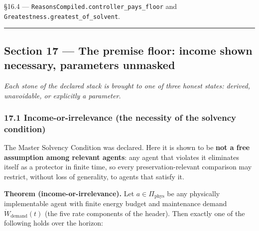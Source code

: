 \documentclass[
]{article}
\begin{document}
§16.4 ---
\texttt{R\allowbreak{}e\allowbreak{}a\allowbreak{}s\allowbreak{}o\allowbreak{}n\allowbreak{}s\allowbreak{}C\allowbreak{}o\allowbreak{}m\allowbreak{}p\allowbreak{}i\allowbreak{}l\allowbreak{}e\allowbreak{}d\allowbreak{}.\allowbreak{}c\allowbreak{}o\allowbreak{}n\allowbreak{}t\allowbreak{}r\allowbreak{}o\allowbreak{}l\allowbreak{}l\allowbreak{}e\allowbreak{}r\allowbreak{}\_\allowbreak{}p\allowbreak{}a\allowbreak{}y\allowbreak{}s\allowbreak{}\_\allowbreak{}f\allowbreak{}l\allowbreak{}o\allowbreak{}o\allowbreak{}r}
and
\texttt{G\allowbreak{}r\allowbreak{}e\allowbreak{}a\allowbreak{}t\allowbreak{}e\allowbreak{}s\allowbreak{}t\allowbreak{}n\allowbreak{}e\allowbreak{}s\allowbreak{}s\allowbreak{}.\allowbreak{}g\allowbreak{}r\allowbreak{}e\allowbreak{}a\allowbreak{}t\allowbreak{}e\allowbreak{}s\allowbreak{}t\allowbreak{}\_\allowbreak{}o\allowbreak{}f\allowbreak{}\_\allowbreak{}s\allowbreak{}o\allowbreak{}l\allowbreak{}v\allowbreak{}e\allowbreak{}n\allowbreak{}t}.

\begin{center}\rule{0.5\linewidth}{0.5pt}\end{center}

\subsection{Section 17 --- The premise floor: income shown necessary,
parameters
unmasked}\label{section-17-the-premise-floor-income-shown-necessary-parameters-unmasked}

\emph{Each stone of the declared stack is brought to one of three honest
states: derived, unavoidable, or explicitly a parameter.}

\subsubsection{17.1 Income-or-irrelevance (the necessity of the solvency
condition)}\label{income-or-irrelevance-the-necessity-of-the-solvency-condition}

The Master Solvency Condition was declared. Here it is shown to be
\textbf{not a free assumption among relevant agents}: any agent that
violates it eliminates itself as a protector in finite time, so every
preservation-relevant comparison may restrict, without loss of
generality, to agents that satisfy it.

\textbf{Theorem (income-or-irrelevance).} Let
\(a\in\Pi_{\mathrm{phys}}\) be any physically implementable agent with
finite energy budget and maintenance demand
\(\dot W_{\mathrm{demand}}(t)\) (the five rate components of the
header). Then exactly one of the following holds over the horizon:
\end{document}
